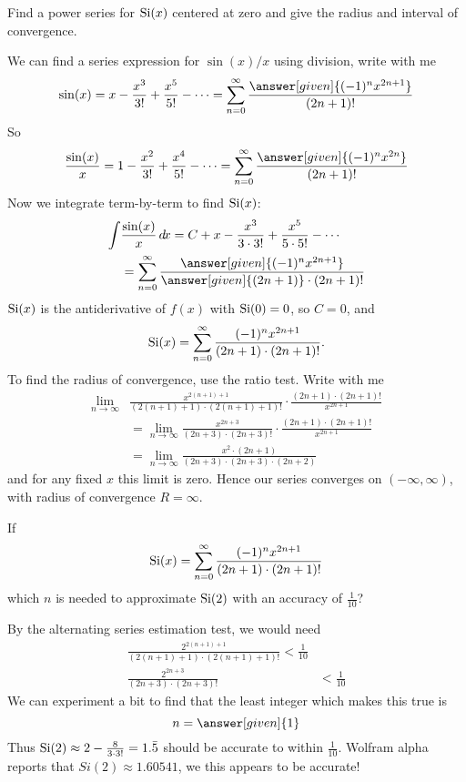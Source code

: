 \documentclass{ximera}
\begin{document}
\begin{example}
  Find a power series for $\operatorname{Si}(x)$ centered at zero and give the
  radius and interval of convergence.
\begin{explanation}
  We can find a series expression for $\sin(x)/x$ using division, write with me
  \[
  \sin(x) = x-\frac{x^3}{3!}+\frac{x^5}{5!}-\dots = \sum_{n=0}^\infty \frac{\answer[given]{(-1)^n x^{2n+1}}}{(2n+1)!} 
  \]
  So 
  \[
  \frac{\sin(x)}{x} =1-\frac{x^2}{3!}+\frac{x^4}{5!}-\dots = \sum_{n=0}^\infty \frac{\answer[given]{(-1)^n x^{2n}}}{(2n+1)!} 
  \]
  Now we integrate term-by-term to find $\operatorname{Si}(x)$:
  \begin{align*}
  \int &\frac{\sin(x)}{x} \d x = C+x-\frac{x^3}{3 \cdot 3!}+\frac{x^5}{5 \cdot 5!}-\cdots \\
  &= \sum_{n=0}^\infty \frac{\answer[given]{(-1)^nx^{2n+1}}}{\answer[given]{(2n+1)} \cdot (2n+1)!} 
  \end{align*}
  $\operatorname{Si}(x)$ is the antiderivative of $f(x)$ with $\operatorname{Si}(0) = 0$, so  $C=0$, and 
  \[
  \operatorname{Si}(x) = \sum_{n=0}^\infty \frac{(-1)^nx^{2n+1}}{(2n+1) \cdot (2n+1)!}.
  \]
  To find the radius of convergence, use the ratio test. Write with me
  \begin{align*}
    \lim_{n\to\infty} &\frac{x^{2(n+1)+1}}{(2(n+1)+1) \cdot (2(n+1)+1)!} \cdot \frac{(2n+1) \cdot (2n+1)!}{x^{2n+1}}\\
    &=\lim_{n\to\infty}\frac{x^{2n+3}}{(2n+3) \cdot (2n+3)!} \cdot \frac{(2n+1) \cdot (2n+1)!}{x^{2n+1}}\\
    &=\lim_{n\to\infty}\frac{x^{2}\cdot (2n+1)}{(2n+3) \cdot (2n+3)\cdot(2n+2)}
  \end{align*}
  and for any fixed $x$ this limit is zero. Hence our series converges
  on $(-\infty,\infty)$, with radius of convergence $R=\infty$.
 \end{explanation}
\end{example}


\begin{example}
  If
  \[
  \operatorname{Si}(x) = \sum_{n=0}^\infty \frac{(-1)^n x^{2n+1}}{(2n+1) \cdot (2n+1)!} 
  \]
  which $n$ is needed to approximate $\operatorname{Si}(2)$ with an accuracy
  of $\frac{1}{10}$?
  \begin{explanation}
    By the alternating series estimation test, we would need
    \begin{align*}
    \frac{2^{2(n+1)+1}}{(2(n+1)+1) \cdot (2(n+1)+1)!}  <  \frac{1}{10}\\
    \frac{ 2^{2n+3}}{(2n+3) \cdot (2n+3)!} &< \frac{1}{10}
    \end{align*}
    We can experiment a bit to find that the least integer which makes this true is 
    \[
    n= \answer[given]{1}
    \]
    Thus $\operatorname{Si}(2) \approx 2-\frac{8}{3 \cdot 3!} = 1.\bar{5}$ should be
    accurate to within $\frac{1}{10}$.  Wolfram alpha reports that $Si(2)
    \approx 1.60541 $, we this appears to be accurate!
  \end{explanation}
\end{example}
\end{document}
